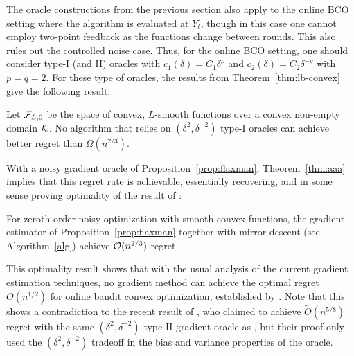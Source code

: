 The oracle constructions from the previous section also apply to the online BCO setting
where the algorithm is evaluated at $Y_t$, though in this case 
one cannot employ two-point feedback as the functions change between rounds. 
This also rules out the controlled noise case. 
Thus, for the online BCO setting, one should consider type-I (and II) oracles with $c_1(\delta) = C_1 \delta^p$ and $c_2(\delta) = C_2\delta^{-q}$ with $p=q=2$.
For these type of oracles, the results from Theorem~\ref{thm:lb-convex} give the following result: 
\begin{theorem}\label{thm:aaa}
Let $\mathcal{F}_{L,0}$ be the space of convex, $L$-smooth functions over a convex non-empty domain $\mathcal{K}$.
No algorithm that relies on 
 $(\delta^2,\delta^{-2})$ type-I oracles
 can achieve better regret than $\Omega(n^{2/3})$.
\end{theorem}
With a noisy gradient oracle of Proposition~\ref{prop:flaxman}, Theorem~\ref{thm:aaa} implies that this regret rate is achievable, essentially recovering, and in some sense proving optimality of the result of \citet{saha2011improved}:
\begin{theorem}
For zeroth order noisy optimization with smooth convex functions, the gradient estimator of Proposition~\ref{prop:flaxman} together with mirror descent (see Algorithm~\ref{alg}) achieve $\mathcal{O}(n^{2/3})$ regret.
\end{theorem}
This optimality result shows that with the usual analysis of the current gradient estimation techniques, no gradient method can achieve the optimal regret $O(n^{1/2})$ for online bandit convex optimization, established by \citet{BubeckDKP15,BuEl15}. Note that this shows a contradiction to the recent result of \citet{DeElKo15}, who claimed to achieve $\tilde{O}(n^{5/8})$ regret with the same $(\delta^2,\delta^{-2})$ type-II gradient oracle as \citet{saha2011improved}, but their proof only used the $(\delta^2,\delta^{-2})$ tradeoff in the bias and variance properties of the oracle.





